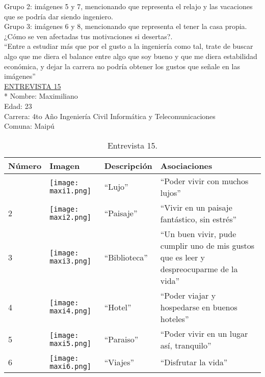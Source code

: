 Grupo 2: imágenes 5 y 7, mencionando que representa el relajo y las vacaciones que se podría dar siendo ingeniero.\\

Grupo 3: imágenes 6 y 8, mencionando que representa el tener la casa propia.\\

¿Cómo se ven afectadas tus motivaciones si desertas?.\\

``Entre a estudiar más que por el gusto a la ingeniería como tal, trate de buscar algo que me diera el balance entre algo que soy bueno y que me diera estabilidad económica, y dejar la carrera no podría obtener los gustos que señale en las imágenes'' \\

\newpage
\underline {ENTREVISTA 15}\\*
Nombre: Maximiliano\\
Edad: 23\\
Carrera: 4to Año Ingeniería Civil Informática y Telecomunicaciones \\
Comuna: Maipú\\

\begin{table}[H]
\centering
\begin{tabular}{>{\centering\arraybackslash}m{1cm} >{\centering\arraybackslash}m{2cm} >{\arraybackslash}m{5cm}>{\arraybackslash}m{5cm}}
\hline
Número  & Imagen & Descripción & Asociaciones \\
\hline \hline

1 & \texttt{[image: maxi1.png]} & ``Lujo'' & ``Poder vivir con muchos lujos'' \\
\hline

2 & \texttt{[image: maxi2.png]} & ``Paisaje'' & ``Vivir en un paisaje fantástico, sin estrés'' \\
\hline

3 & \texttt{[image: maxi3.png]} & ``Biblioteca'' & ``Un buen vivir, pude cumplir uno de mis gustos que es leer y despreocuparme de la vida'' \\
\hline

4 & \texttt{[image: maxi4.png]} & ``Hotel'' & ``Poder viajar y hospedarse en buenos hoteles'' \\
\hline

5 & \texttt{[image: maxi5.png]} & ``Paraiso'' & ``Poder vivir en un lugar así, tranquilo'' \\
\hline

6 & \texttt{[image: maxi6.png]} & ``Viajes'' & ``Disfrutar la vida'' \\
\hline


\end{tabular}
\caption{Entrevista 15.}
\label{tabla:maxi}
\end{table}

